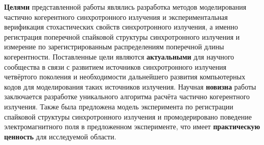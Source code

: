 \textbf{Целями} представленной работы являлись разработка методов моделирования частично когерентного синхротронного излучения и экспериментальная верификация стохастических свойств синхротронного излучения, а именно регистрация поперечной спайковой структуры синхротронного излучения и измерение по зарегистрированным распределениям поперечной длины когерентности. Поставленные цели являются \textbf{актуальными} для научного сообщества в связи с развитием источников синхротронного излучения четвёртого поколения и необходимости дальнейшего развития компьютерных кодов для моделирования таких источников излучения. Научная \textbf{новизна} работы заключается разработке уникального алгоритма расчёта частично когерентного излучения. Также была предложена модель эксперимента по регистрации спайковой структуры синхротронного излучения и промодерировано поведение электромагнитного поля в предложенном эксперименте, что имеет \textbf{практическую ценность} для исследуемой области. 








